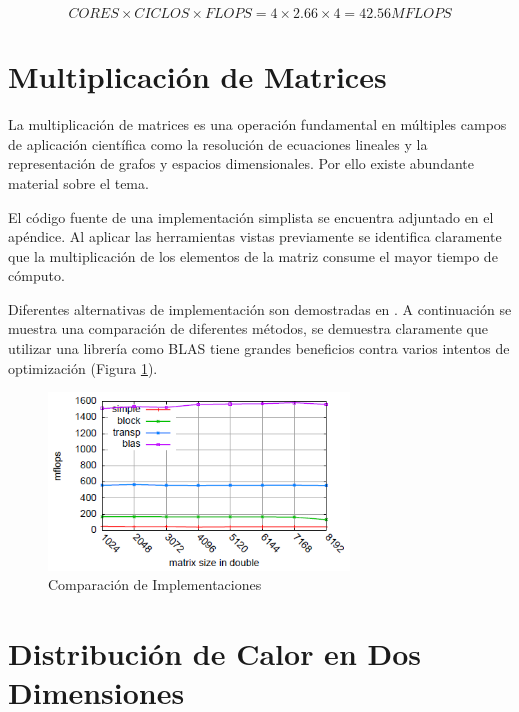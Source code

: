 \documentclass[a4paper]{report}
\begin{document}
\begin{equation}
\label{eq:flops}
CORES \times CICLOS \times FLOPS = 4 \times 2.66 \times 4 = 42.56 MFLOPS
\end{equation}

\section{Multiplicación de Matrices}

La multiplicación de matrices es una operación fundamental en múltiples
campos de aplicación científica como la resolución de ecuaciones
lineales y la representación de grafos y espacios dimensionales. Por ello
existe abundante material sobre el tema. 

{\small  }

El código fuente de una implementación simplista se encuentra adjuntado en
el apéndice. Al aplicar las herramientas vistas previamente se identifica
claramente que la multiplicación de los elementos de la matriz consume el
mayor tiempo de cómputo.

\bigskip

Diferentes alternativas de implementación son demostradas en \cite{mm-matrixmultiplicationtool}. A continuación se muestra una comparación de diferentes métodos, se demuestra claramente que utilizar una librería como BLAS tiene grandes beneficios contra varios intentos de optimización (Figura \ref{fig:mm}).

\begin{figure}[H]
\label{fig:mm}
\begin{center}
\includegraphics[width=8cm]{mm.png}
\caption{Comparación de Implementaciones}
\end{center}
\end{figure}


\section{Distribución de Calor en Dos Dimensiones}
\end{document}
